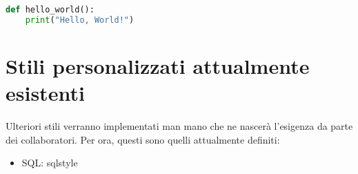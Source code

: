 
\begin{lstlisting}[language=Python]
	def hello_world():
	print("Hello, World!")
\end{lstlisting}

\section{Stili personalizzati attualmente esistenti}
Ulteriori stili verranno implementati man mano che ne nascerà l'esigenza da parte dei collaboratori. Per ora, questi sono quelli attualmente definiti:
\begin{itemize}
	\item SQL: sqlstyle
\end{itemize}
